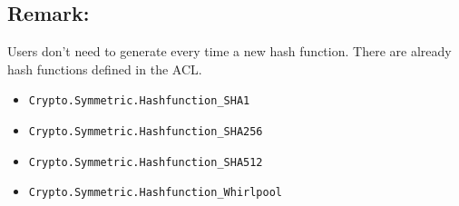 \subsection*{Remark:}
Users don't need to generate every time a new hash function. There are
already hash functions defined in the ACL.
\begin{itemize}
\item \texttt{Crypto.Symmetric.Hashfunction\_SHA1}
\item \texttt{Crypto.Symmetric.Hashfunction\_SHA256}
\item \texttt{Crypto.Symmetric.Hashfunction\_SHA512}
\item \texttt{Crypto.Symmetric.Hashfunction\_Whirlpool}
\end{itemize}
